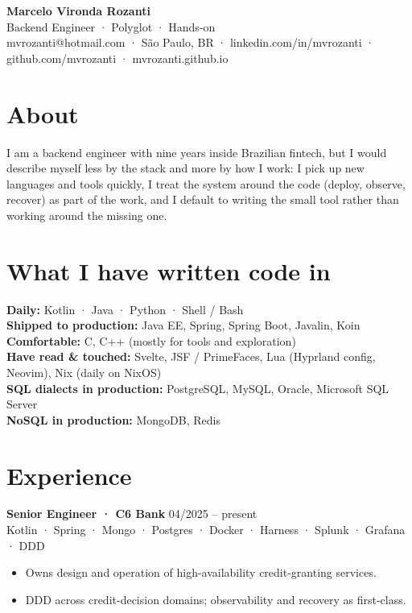 \documentclass[10pt,a4paper]{article}
\begin{document}
\begin{center}
{\Huge\bfseries Marcelo Vironda Rozanti}\\[3pt]
{\large\color{accent} Backend Engineer · Polyglot · Hands-on}\\[3pt]
{\small mvrozanti@hotmail.com · São Paulo, BR · linkedin.com/in/mvrozanti · github.com/mvrozanti · mvrozanti.github.io}
\end{center}

\section{About}
I am a backend engineer with nine years inside Brazilian fintech, but I would describe myself less by the stack and more by how I work: I pick up new languages and tools quickly, I treat the system around the code (deploy, observe, recover) as part of the work, and I default to writing the small tool rather than working around the missing one.

\section{What I have written code in}

\noindent\textbf{Daily:} Kotlin · Java · Python · Shell / Bash\\
\textbf{Shipped to production:} Java EE, Spring, Spring Boot, Javalin, Koin\\
\textbf{Comfortable:} C, C++ (mostly for tools and exploration)\\
\textbf{Have read \& touched:} Svelte, JSF / PrimeFaces, Lua (Hyprland config, Neovim), Nix (daily on NixOS)\\
\textbf{SQL dialects in production:} PostgreSQL, MySQL, Oracle, Microsoft SQL Server\\
\textbf{NoSQL in production:} MongoDB, Redis

\section{Experience}

\noindent\textbf{Senior Engineer · C6 Bank} \hfill 04/2025 -- present\\
{\small\color{muted}Kotlin · Spring · Mongo · Postgres · Docker · Harness · Splunk · Grafana · DDD}
\begin{itemize}
\item Owns design and operation of high-availability credit-granting services.
\item DDD across credit-decision domains; observability and recovery as first-class.
\end{itemize}
\end{document}
